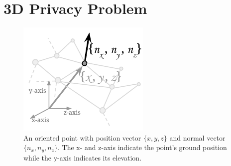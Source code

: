 
%

\section{3D Privacy Problem}%
\label{sec:framework}

\begin{figure}[t!]
	\centering
	\vspace{-2mm}
	\includegraphics[width=0.4\columnwidth]{figures/3D_data_point_description}%
	\vspace{-4mm}
	\caption{An oriented point with position vector $\{x,y,z\}$ and normal vector $\{n_x, n_y, n_z\}$. {\small The x- and z-axis indicate the point's ground position while the y-axis indicates its elevation.}}
	\vspace{-2mm}
	\label{fig:3D-data-point}
\end{figure}

